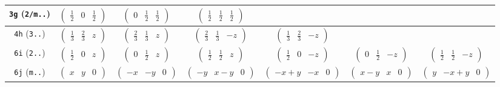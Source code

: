 \documentclass[fleqn,9pt,landscape]{jsarticle}
\begin{document}
\begin{center}
\begin{longtable}{ccccccc}
{\tt 3g} ({\tt 2/m..}) & $ \begin{pmatrix} \frac{1}{2} & 0 & \frac{1}{2} \end{pmatrix} $ & $ \begin{pmatrix} 0 & \frac{1}{2} & \frac{1}{2} \end{pmatrix} $ & $ \begin{pmatrix} \frac{1}{2} & \frac{1}{2} & \frac{1}{2} \end{pmatrix} $ & $  $ & $  $ & $  $ \\ \hline
{\tt 4h} ({\tt 3..}) & $ \begin{pmatrix} \frac{1}{3} & \frac{2}{3} & z \end{pmatrix} $ & $ \begin{pmatrix} \frac{2}{3} & \frac{1}{3} & z \end{pmatrix} $ & $ \begin{pmatrix} \frac{2}{3} & \frac{1}{3} & - z \end{pmatrix} $ & $ \begin{pmatrix} \frac{1}{3} & \frac{2}{3} & - z \end{pmatrix} $ & $  $ & $  $ \\ \hline
{\tt 6i} ({\tt 2..}) & $ \begin{pmatrix} \frac{1}{2} & 0 & z \end{pmatrix} $ & $ \begin{pmatrix} 0 & \frac{1}{2} & z \end{pmatrix} $ & $ \begin{pmatrix} \frac{1}{2} & \frac{1}{2} & z \end{pmatrix} $ & $ \begin{pmatrix} \frac{1}{2} & 0 & - z \end{pmatrix} $ & $ \begin{pmatrix} 0 & \frac{1}{2} & - z \end{pmatrix} $ & $ \begin{pmatrix} \frac{1}{2} & \frac{1}{2} & - z \end{pmatrix} $ \\ \hline
{\tt 6j} ({\tt m..}) & $ \begin{pmatrix} x & y & 0 \end{pmatrix} $ & $ \begin{pmatrix} - x & - y & 0 \end{pmatrix} $ & $ \begin{pmatrix} - y & x - y & 0 \end{pmatrix} $ & $ \begin{pmatrix} - x + y & - x & 0 \end{pmatrix} $ & $ \begin{pmatrix} x - y & x & 0 \end{pmatrix} $ & $ \begin{pmatrix} y & - x + y & 0 \end{pmatrix} $ \\ \hline

\end{longtable}
\end{center}
\end{document}
